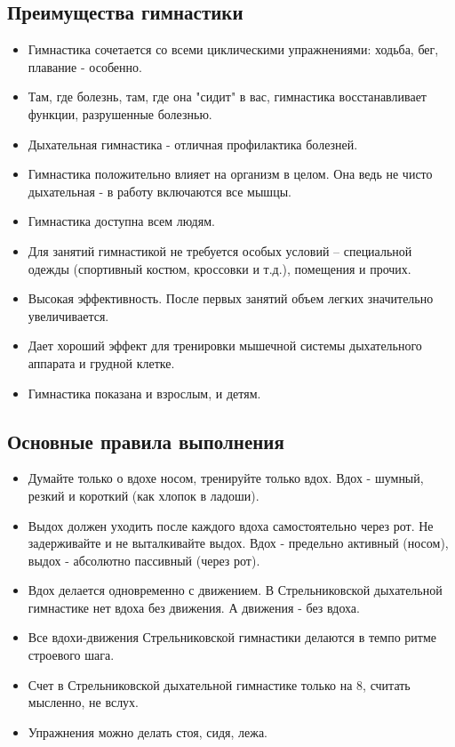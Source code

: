 \documentclass[14pt, a4paper]{article}
\begin{document}
    \subsection{Преимущества гимнастики}
    \begin{itemize}
        \item Гимнастика сочетается со всеми циклическими упражнениями: ходьба, бег, плавание - особенно.
        \item Там, где болезнь, там, где она "сидит" в вас, гимнастика восстанавливает функции, разрушенные болезнью.
        \item Дыхательная гимнастика - отличная профилактика болезней.
        \item Гимнастика положительно влияет на организм в целом. Она ведь не чисто дыхательная - в работу включаются все мышцы.
        \item Гимнастика доступна всем людям.
        \item Для занятий гимнастикой не требуется особых условий – специальной одежды (спортивный костюм, кроссовки и т.д.), помещения и прочих.
        \item Высокая эффективность. После первых занятий объем легких значительно увеличивается.
        \item Дает хороший эффект для тренировки мышечной системы дыхательного аппарата и грудной клетке.
        \item Гимнастика показана и взрослым, и детям.
    \end{itemize}

    \subsection{Основные правила выполнения}
    \begin{itemize}
        \item Думайте только о вдохе носом, тренируйте только вдох. Вдох - шумный, резкий и короткий (как хлопок в ладоши).
        \item Выдох должен уходить после каждого вдоха самостоятельно через рот. Не задерживайте и не выталкивайте выдох. Вдох - предельно активный (носом), выдох - абсолютно пассивный (через рот).
        \item Вдох делается одновременно с движением. В Стрельниковской дыхательной гимнастике нет вдоха без движения. А движения - без вдоха.
        \item Все вдохи-движения Стрельниковской гимнастики делаются в темпо ритме строевого шага.
        \item Счет в Стрельниковской дыхательной гимнастике только на 8, считать мысленно, не вслух.
        \item Упражнения можно делать стоя, сидя, лежа.
    \end{itemize}
\end{document}
